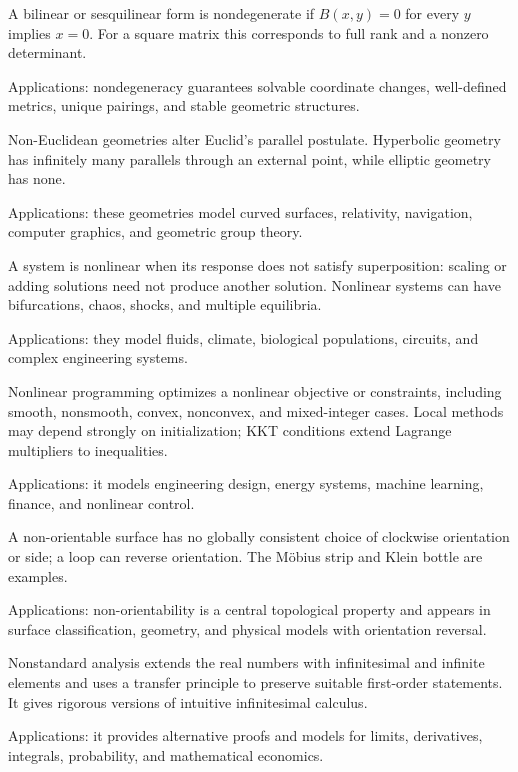 A bilinear or sesquilinear form is nondegenerate if $B(x,y)=0$ for every $y$ implies $x=0$. For a square matrix this corresponds to full rank and a nonzero determinant. \par\noindent Applications: nondegeneracy guarantees solvable coordinate changes, well-defined metrics, unique pairings, and stable geometric structures.

Non-Euclidean geometries alter Euclid's parallel postulate. Hyperbolic geometry has infinitely many parallels through an external point, while elliptic geometry has none. \par\noindent Applications: these geometries model curved surfaces, relativity, navigation, computer graphics, and geometric group theory.

A system is nonlinear when its response does not satisfy superposition: scaling or adding solutions need not produce another solution. Nonlinear systems can have bifurcations, chaos, shocks, and multiple equilibria. \par\noindent Applications: they model fluids, climate, biological populations, circuits, and complex engineering systems.

Nonlinear programming optimizes a nonlinear objective or constraints, including smooth, nonsmooth, convex, nonconvex, and mixed-integer cases. Local methods may depend strongly on initialization; KKT conditions extend Lagrange multipliers to inequalities. \par\noindent Applications: it models engineering design, energy systems, machine learning, finance, and nonlinear control.

A non-orientable surface has no globally consistent choice of clockwise orientation or side; a loop can reverse orientation. The Möbius strip and Klein bottle are examples. \par\noindent Applications: non-orientability is a central topological property and appears in surface classification, geometry, and physical models with orientation reversal.

Nonstandard analysis extends the real numbers with infinitesimal and infinite elements and uses a transfer principle to preserve suitable first-order statements. It gives rigorous versions of intuitive infinitesimal calculus. \par\noindent Applications: it provides alternative proofs and models for limits, derivatives, integrals, probability, and mathematical economics.

